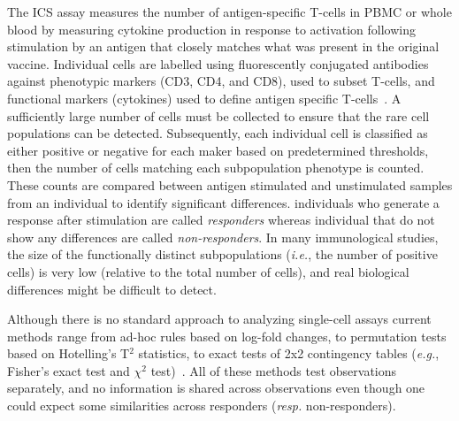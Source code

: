 \documentclass[useAMS,referee,usenatbib]{biom}
\begin{document}
The ICS assay measures the number of antigen-specific T-cells in PBMC or whole blood by measuring cytokine production in response to activation following stimulation by an antigen that closely matches what was present in the original vaccine. 
Individual cells are labelled using fluorescently conjugated antibodies against phenotypic markers (CD3, CD4, and CD8), used to subset T-cells, and functional markers (cytokines) used to define antigen specific T-cells~\citep{Horton:2007tsa,DeRosa:2004wp,Betts:2006dw}.
A sufficiently large number of cells must be collected to ensure that the rare cell populations can be detected. 
Subsequently, each individual cell is classified as either positive or negative for each maker based on predetermined thresholds, then the number of cells matching each subpopulation phenotype is counted. 
These counts are compared between antigen stimulated and unstimulated samples from an individual to identify significant differences. individuals who generate a response after stimulation are called \textit{responders} whereas individual that do not show any differences are called \textit{non-responders}. 
In many immunological studies, the size of the functionally distinct subpopulations (\textit{i.e.}, the number of positive cells) is very low (relative to the total number of cells), and real biological differences might be difficult to detect. 

Although there is no standard approach to analyzing single-cell assays current methods range from ad-hoc rules based on log-fold changes, to permutation tests based on Hotelling's T$^2$ statistics, to exact tests of 2x2 contingency tables (\textit{e.g.}, Fisher's exact test and $\chi^2$ test)~\citep{Trigona:2003,Sinclair:2004hs,Horton:2007tsa,Nason:2006dx,Peiperl:2010ej,Proschan:2009ks}. 
All of these methods test observations separately, and no information is shared across observations even though one could expect some similarities across responders (\textit{resp.} non-responders). %
\end{document}

